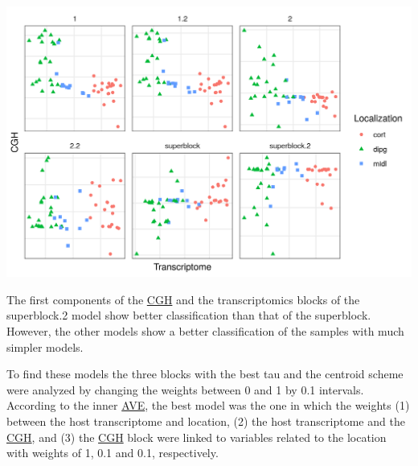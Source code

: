 \documentclass[
  12pt,
  a4paper,
  twoside,
  openright]{book}
\let\origfigure\figure
\let\endorigfigure\endfigure
\renewenvironment{figure}[1][2] {
    \expandafter\origfigure\expandafter[!htbp]
} {
    \endorigfigure
}
\begin{document}
\begin{figure}
\includegraphics[width=1\linewidth]{images/pugets_models} \caption[Different RGCCA models in the Puget's dataset.]{Different RGCCA models in the Puget's dataset. The different models with the same data showing the sample position on the first components of the CGH  and the transcriptome (or GE) block. Model 1 and 1.2 with transcriptomics, CGH data and all the data about the samples together. Model 2 and 2.2 with transcriptomics, CGH data and all the data about the samples on different blocks. Model superblock and superblock.2 have all the data from different blokcs and one block with all the data. All of them separate the samples according according to the transcriptome component by the localization of the tumors.}\label{fig:puget-models}
\end{figure}

The first components of the \protect\hyperlink{acronyms_CGH}{CGH} and the transcriptomics blocks of the superblock.2 model show better classification than that of the superblock.
However, the other models show a better classification of the samples with much simpler models.

To find these models the three blocks with the best tau and the centroid scheme were analyzed by changing the weights between 0 and 1 by 0.1 intervals.
According to the inner \protect\hyperlink{acronyms_AVE}{AVE}, the best model was the one in which the weights (1) between the host transcriptome and location, (2) the host transcriptome and the \protect\hyperlink{acronyms_CGH}{CGH}, and (3) the \protect\hyperlink{acronyms_CGH}{CGH} block were linked to variables related to the location with weights of 1, 0.1 and 0.1, respectively.
\end{document}
